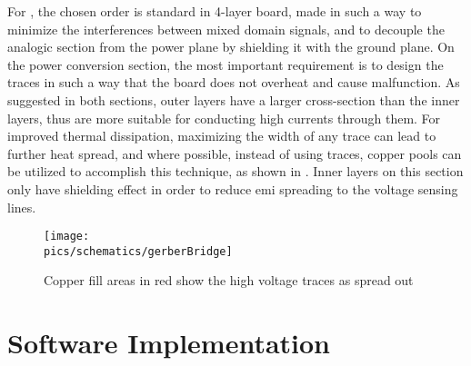 For , the chosen order is standard in 4-layer board, made in such a way to minimize the interferences between mixed domain signals, and to decouple the analogic section from the power plane by shielding it with the ground plane.
On the power conversion section, the most important requirement is to design the traces in such a way that the board does not overheat and cause malfunction.
As suggested in both sections, outer layers have a larger cross-section than the inner layers, thus are more suitable for conducting high currents through them.
For improved thermal dissipation, maximizing the width of any trace can lead to further heat spread, and where possible, instead of using traces, copper pools can be utilized to accomplish this technique, as shown in .
Inner layers on this section only have shielding effect in order to reduce \gls{emi} spreading to the voltage sensing lines.

\begin{figure}[!ht]
    \begin{center}\texttt{[image: \\pics/schematics/gerberBridge]}\end{center}
    \caption{Copper fill areas in red show the high voltage traces as spread out}
    \label{fig:gerberbridge}
\end{figure}

\section{Software Implementation}
\label{sec:swimp}
